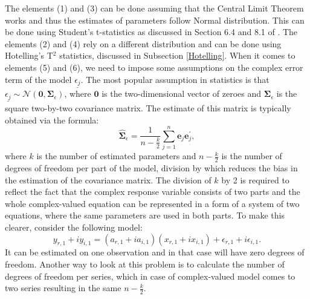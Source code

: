 \documentclass[
]{book}
\begin{document}
The elements (1) and (3) can be done assuming that the Central Limit Theorem works and thus the estimates of parameters follow Normal distribution. This can be done using Student's t-statistics as discussed in Section 6.4 and 8.1 of \citet{SvetunkovSBA}. The elements (2) and (4) rely on a different distribution and can be done using Hotelling's T\(^2\) statistics, discussed in Subsection \ref{Hotelling}. When it comes to elements (5) and (6), we need to impose some assumptions on the complex error term of the model \(\underline{\epsilon_j}\). The most popular assumption in statistics is that \(\underline{\epsilon_j} \sim \mathcal{N}(\boldsymbol{0}, \boldsymbol{\Sigma}_\epsilon)\), where \(\boldsymbol{0}\) is the two-dimensional vector of zeroes and \(\boldsymbol{\Sigma}_\epsilon\) is the square two-by-two covariance matrix. The estimate of this matrix is typically obtained via the formula:
\begin{equation*}
    \hat{\boldsymbol{\Sigma}}_\epsilon = \frac{1}{n-\frac{k}{2}} \sum_{j=1}^{n} \boldsymbol{e}_j \boldsymbol{e}_j^\prime ,
\end{equation*}
where \(k\) is the number of estimated parameters and \(n-\frac{k}{2}\) is the number of degrees of freedom per part of the model, division by which reduces the bias in the estimation of the covariance matrix. The division of \(k\) by 2 is required to reflect the fact that the complex response variable consists of two parts and the whole complex-valued equation can be represented in a form of a system of two equations, where the same parameters are used in both parts. To make this clearer, consider the following model:
\begin{equation*}
    y_{r,1} + i y_{i,1} = (a_{r,1} + i a_{i,1}) (x_{r,1} + i x_{i,1}) + \epsilon_{r,1} + i \epsilon_{i,1} .
\end{equation*}
It can be estimated on one observation and in that case will have zero degrees of freedom. Another way to look at this problem is to calculate the number of degrees of freedom per series, which in case of complex-valued model comes to two series resulting in the same \(n-\frac{k}{2}\).
\end{document}
